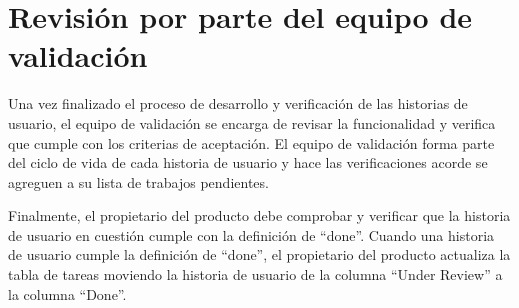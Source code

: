 \section{Revisión por parte del equipo de validación}
Una vez finalizado el proceso de desarrollo y verificación de las historias de usuario, el equipo de validación se encarga de revisar la funcionalidad y verifica que cumple con los criterias de aceptación. El equipo de validación forma parte del ciclo de vida de cada historia de usuario y hace las verificaciones acorde se agreguen a su lista de trabajos pendientes.

Finalmente, el propietario del producto debe comprobar y verificar que la historia de usuario en cuestión cumple con la definición de \enquote{done}. Cuando una historia de usuario cumple la definición de \enquote{done}, el propietario del producto actualiza la tabla de tareas moviendo la historia de usuario de la columna \enquote{Under Review} a la columna \enquote{Done}.